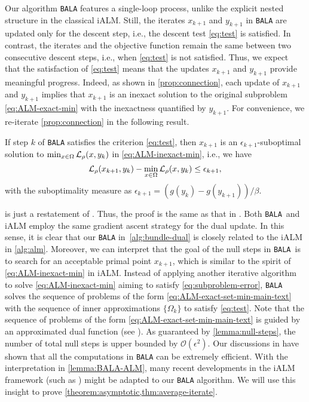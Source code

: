 \documentclass[11pt]{article}
\newcommand{\alg}{\texttt{BALA}}%
\begin{document}
Our algorithm \alg{} features a single-loop process, unlike the explicit nested structure in the classical iALM. Still, the iterates $x_{k+1}$ and $y_{k+1}$ in \alg{} are updated only for the descent step, i.e., the descent test \cref{eq:test} is satisfied. In contrast, the iterates and the objective function remain the same between two consecutive descent steps, i.e.,  when \cref{eq:test} is not satisfied. Thus, we expect that the satisfaction of \cref{eq:test} means that the updates  $x_{k+1}$ and $y_{k+1}$ provide meaningful progress. Indeed, as shown in \cref{prop:connection}, each update of $x_{k+1}$ and $y_{k+1}$ implies that $x_{k+1}$ is an inexact solution to the original subproblem \eqref{eq:ALM-exact-min} with the inexactness quantified by $y_{k+1}$. For convenience, we re-iterate \cref{prop:connection} in the following result. %
\begin{lemma} \label{lemma:BALA-ALM}
    If step $k$ of \alg{} satisfies the criterion \cref{eq:test}, then  $x_{k+1}$ is an $\epsilon_{k+1}$-suboptimal solution to $\min_{x \in \Omega} \mathcal{L}_{\rho}(x,y_k)$ in \cref{eq:ALM-inexact-min}, i.e., we have
    \begin{equation*}
        \mathcal{L}_{\rho}(x_{k+1},y_k) - \min_{x \in \Omega} \mathcal{L}_{\rho}(x,y_k)\leq \epsilon_{k+1},
    \end{equation*}
    with the suboptimality measure as 
    $
    \epsilon_{k+1} = (g(y_k) - g(y_{k+1}))/\beta. 
    $
\end{lemma}
 is just a restatement of . Thus, the proof is the same as that in . 
% 
Both \alg~and iALM employ the same gradient ascent strategy for the dual update. In this sense, it is clear that our \alg{} in~\cref{alg:bundle-dual} is closely related to the iALM in \cref{alg:alm}. 
%
 Moreover, we can interpret that the goal of the null steps in \alg~is to search for an acceptable primal point $x_{k+1}$, which is similar to the spirit of \eqref{eq:ALM-inexact-min} in iALM. Instead of applying another iterative algorithm to solve \eqref{eq:ALM-inexact-min} aiming to satisfy \eqref{eq:subproblem-error}, \alg{} solves the sequence of problems of the form \eqref{eq:ALM-exact-set-min-main-text} with the sequence of inner approximations $\{\Omega_{k}\}$ to satisfy \eqref{eq:test}. Note that the sequence of problems of the form \eqref{eq:ALM-exact-set-min-main-text} is guided by an approximated dual function (see ). As guaranteed by \cref{lemma:null-steps}, the number of total null steps is upper bounded by $\mathcal{O}(\epsilon^2)$. Our discussions in  have shown that all the computations in \alg{} can be extremely efficient. With the interpretation in \cref{lemma:BALA-ALM}, many recent developments in the iALM framework (such as \cite{xu2021iteration}) might be adapted to our \alg{} algorithm. We will use this insight to prove \cref{theorem:asymptotic,thm:average-iterate}.
\end{document}
